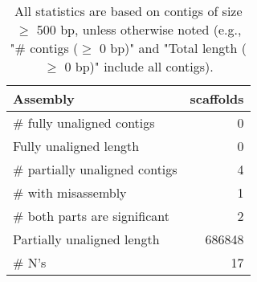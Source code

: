 \documentclass[12pt,a4paper]{article}
\begin{document}
\begin{table}[ht]
\begin{center}
\caption{All statistics are based on contigs of size $\geq$ 500 bp, unless otherwise noted (e.g., "\# contigs ($\geq$ 0 bp)" and "Total length ($\geq$ 0 bp)" include all contigs).}
\begin{tabular}{|l*{1}{|r}|}
\hline
Assembly & scaffolds \\ \hline
\# fully unaligned contigs & 0 \\ \hline
Fully unaligned length & 0 \\ \hline
\# partially unaligned contigs & 4 \\ \hline
\hspace{5mm}\# with misassembly & 1 \\ \hline
\hspace{5mm}\# both parts are significant & 2 \\ \hline
Partially unaligned length & 686848 \\ \hline
\# N's & 17 \\ \hline
\end{tabular}
\end{center}
\end{table}
\end{document}
